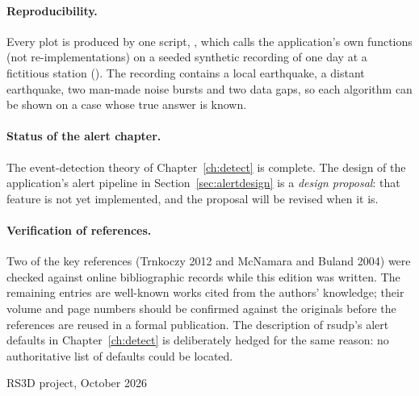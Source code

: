 \paragraph{Reproducibility.}
Every plot is produced by one script, , which calls the application's own
functions (not re-implementations) on a seeded synthetic recording of one day at a fictitious station
(). The recording contains a local earthquake, a distant earthquake, two man-made noise bursts and two
data gaps, so each algorithm can be shown on a case whose true answer is known.

\paragraph{Status of the alert chapter.}
The event-detection theory of Chapter~\ref{ch:detect} is complete. The design of the application's alert pipeline in
Section~\ref{sec:alertdesign} is a \emph{design proposal}: that feature is not yet implemented, and the proposal
will be revised when it is.

\paragraph{Verification of references.}
Two of the key references (Trnkoczy 2012 and McNamara and Buland 2004) were checked against online bibliographic
records while this edition was written. The remaining entries are well-known works cited from the authors'
knowledge; their volume and page numbers should be confirmed against the originals before the references are
reused in a formal publication. The description of rsudp's alert defaults in Chapter~\ref{ch:detect} is deliberately
hedged for the same reason: no authoritative list of defaults could be located.

\bigskip
\begin{center}\small\textsf{\textcolor{rs3dgrey}{RS3D project, October 2026}}\end{center}

